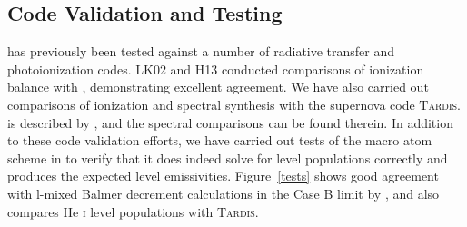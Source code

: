 \documentclass[preprint, a4paper, 11pt]{aastex}
\begin{document}
\subsection{Code Validation and Testing}

\py has previously been tested against a number of radiative transfer and
photoionization codes. LK02 and H13 conducted comparisons of ionization balance 
with \cld \citep{cloudy2013}, demonstrating excellent agreement. 
We have also carried out comparisons
of ionization and spectral synthesis with the supernova code \textsc{Tardis.} \tar is described by
\cite{kerzendorfsim}, and the spectral comparisons can be found therein.
In addition to these code validation efforts, we have carried out tests of
the macro atom scheme in \py to verify that it does indeed solve for level populations correctly
and produces the expected level emissivities. Figure~\ref{tests} shows good agreement with 
l-mixed Balmer decrement calculations in the Case B limit by \cite{seaton1959}, and 
also compares He \textsc{i} level populations with \textsc{Tardis.}


\end{document}
